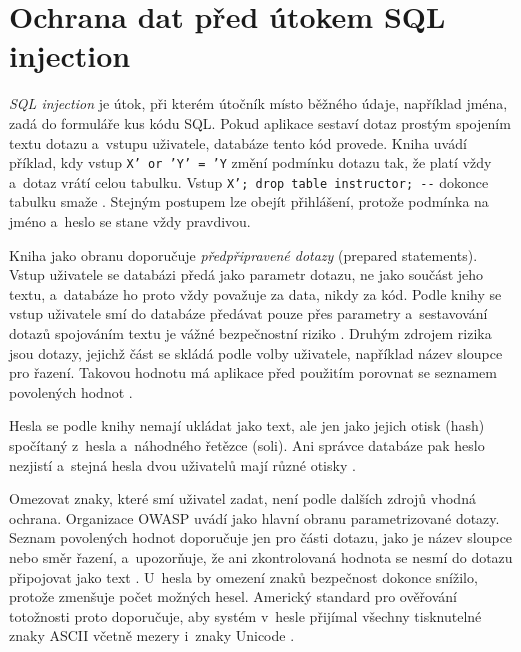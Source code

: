 \section{Ochrana dat před útokem SQL injection}\label{sec:principy-sql-injection}

\emph{SQL injection} je útok, při kterém útočník místo běžného údaje, například jména, zadá do formuláře kus kódu SQL. Pokud aplikace sestaví dotaz prostým spojením textu dotazu a~vstupu uživatele, databáze tento kód provede. Kniha uvádí příklad, kdy vstup \texttt{X' or 'Y' = 'Y} změní podmínku dotazu tak, že platí vždy a~dotaz vrátí celou tabulku. Vstup \texttt{X'; drop table instructor; -{}-} dokonce tabulku smaže \cite[s.~189--190]{Silberschatz2020}. Stejným postupem lze obejít přihlášení, protože podmínka na jméno a~heslo se stane vždy pravdivou.

Kniha jako obranu doporučuje \emph{předpřipravené dotazy} (prepared statements). Vstup uživatele se databázi předá jako parametr dotazu, ne jako součást jeho textu, a~databáze ho proto vždy považuje za data, nikdy za kód. Podle knihy se vstup uživatele smí do databáze předávat pouze přes parametry a~sestavování dotazů spojováním textu je vážné bezpečnostní riziko \cite[s.~190]{Silberschatz2020}. Druhým zdrojem rizika jsou dotazy, jejichž část se skládá podle volby uživatele, například název sloupce pro řazení. Takovou hodnotu má aplikace před použitím porovnat se seznamem povolených hodnot \cite[s.~438--439]{Silberschatz2020}.

Hesla se podle knihy nemají ukládat jako text, ale jen jako jejich otisk (hash) spočítaný z~hesla a~náhodného řetězce (soli). Ani správce databáze pak heslo nezjistí a~stejná hesla dvou uživatelů mají různé otisky \cite[s.~414]{Silberschatz2020}.

Omezovat znaky, které smí uživatel zadat, není podle dalších zdrojů vhodná ochrana. Organizace OWASP uvádí jako hlavní obranu parametrizované dotazy. Seznam povolených hodnot doporučuje jen pro části dotazu, jako je název sloupce nebo směr řazení, a~upozorňuje, že ani zkontrolovaná hodnota se nesmí do dotazu připojovat jako text \cite{owasp-sqli}. U~hesla by omezení znaků bezpečnost dokonce snížilo, protože zmenšuje počet možných hesel. Americký standard pro ověřování totožnosti proto doporučuje, aby systém v~hesle přijímal všechny tisknutelné znaky ASCII včetně mezery i~znaky Unicode \cite[odd.~3.1.1.2]{nist-800-63b}.
